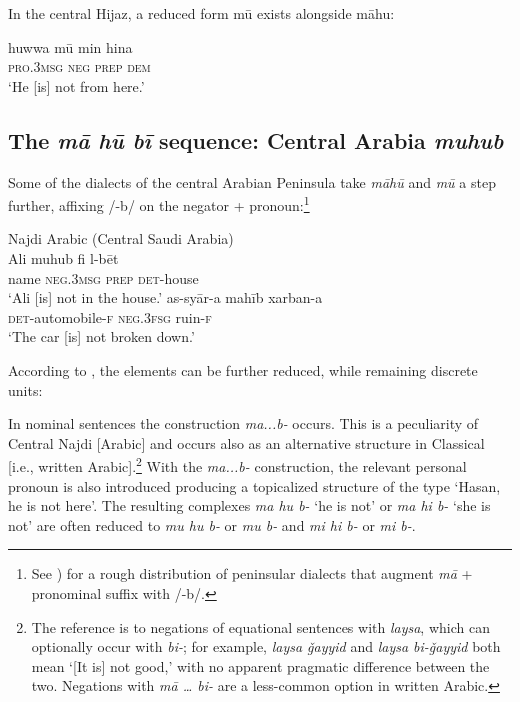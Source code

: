 \documentclass[output=paper]{langsci/langscibook}
\begin{document}
In the central Hijaz, a reduced form mū exists alongside māhu:

\ea \label{ex:WiAR-32}
	\gll huwwa mū min hina \\
	\textsc{pro.3msg} \textsc{neg} \textsc{prep} \textsc{dem}\\
	\glt ‘He [is] not from here.’ \citep[41]{omar1975a}
\z

\subsection{The \textit{mā hū bī} sequence: Central Arabia \textit{muhub}} \label{s:WiAR-4.4}

Some of the dialects of the central Arabian Peninsula take \textit{māhū} and \textit{mū} a step further, affixing /-b/ on the negator + pronoun:\footnote{See \citet[127]{prochazka2010a}) for a rough distribution of peninsular dialects that augment \textit{mā}  + pronominal suffix with /-b/.}

\ea Najdi Arabic (Central Saudi Arabia)\label{ex:WiAR-33}\\
  \ea
  	\gll Ali muhub fi l-bēt\\
  	name \textsc{neg.3msg} \textsc{prep} \textsc{det}-house\\
  	\glt ‘Ali [is] not in the house.’ \citep[75]{binturki2015a}
  \ex
  	\gll as-syār-a mahīb xarban-a\\
  	\textsc{det}-automobile-\textsc{f} \textsc{neg.3fsg} ruin-\textsc{f}\\
  	\glt ‘The car [is] not broken down.’ \citep[76]{binturki2015a}
\z \z


According to \citet{ingham1994a}, the elements can be further reduced, while remaining discrete units:

\begin{displayquote}
    In nominal sentences the construction \textit{ma...b-} occurs. This is a peculiarity of Central Najdi [Arabic] and occurs also as an alternative structure in Classical [i.e., written Arabic].\footnote{The reference is to negations of equational sentences with \textit{laysa}, which can optionally occur with \textit{bi-}; for example, \textit{laysa ǧayyid} and \textit{laysa bi-ǧayyid} both mean ‘[It is] not good,’ with no apparent pragmatic difference between the two. Negations with \textit{mā … bi-} are a less-common option in written Arabic.} With the \textit{ma...b-} construction, the relevant personal pronoun is also introduced producing a topicalized structure of the type ‘Hasan, he is not here’. The resulting complexes \textit{ma hu b-} ‘he is not’ or \textit{ma hi b-} ‘she is not’ are often reduced to \textit{mu hu b-} or \textit{mu b-} and \textit{mi hi b-} or \textit{mi b-}. \citep{ingham1994a}
\end{displayquote}
\end{document}

